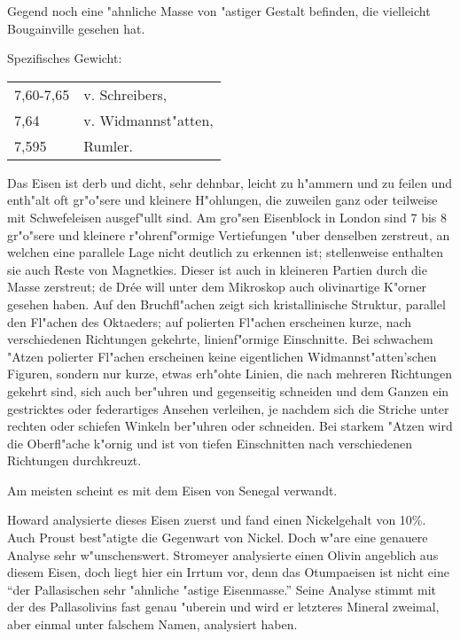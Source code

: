 \documentclass[a4paper, 11pt, oneside]{article}
\begin{document}
Gegend noch eine "ahnliche Masse von "astiger Gestalt befinden, die vielleicht Bougainville gesehen hat.

Spezifisches Gewicht:  
\begin{table}[!ht]
    \centering\swabfamily\Large
    \begin{tabular}{l l}
        7,60-7,65 & v. Schreibers,\\
        7,64 & v. Widmannst"atten,\\
        7,595 & Rumler.
    \end{tabular}
\end{table}

Das Eisen ist derb und dicht, sehr dehnbar, leicht zu h"ammern und zu feilen und enth"alt oft gr"o"sere und kleinere H"ohlungen, die zuweilen ganz oder teilweise mit Schwefeleisen ausgef"ullt sind. Am gro"sen Eisenblock in London sind 7 bis 8 gr"o"sere und kleinere r"ohrenf"ormige Vertiefungen "uber denselben zerstreut, an welchen eine parallele Lage nicht deutlich zu erkennen ist; stellenweise enthalten sie auch Reste von Magnetkies. Dieser ist auch in kleineren Partien durch die Masse zerstreut; de Drée will unter dem Mikroskop auch olivinartige K"orner gesehen haben. Auf den Bruchfl"achen zeigt sich kristallinische Struktur, parallel den Fl"achen des Oktaeders; auf polierten Fl"achen erscheinen kurze, nach verschiedenen Richtungen gekehrte, linienf"ormige Einschnitte. Bei schwachem "Atzen polierter Fl"achen erscheinen keine eigentlichen Widmannst"atten'schen Figuren, sondern nur kurze, etwas erh"ohte Linien, die nach mehreren Richtungen gekehrt sind, sich auch ber"uhren und gegenseitig schneiden und dem Ganzen ein gestricktes oder federartiges Ansehen verleihen, je nachdem sich die Striche unter rechten oder schiefen Winkeln ber"uhren oder schneiden. Bei starkem "Atzen wird die Oberfl"ache k"ornig und ist von tiefen Einschnitten nach verschiedenen Richtungen durchkreuzt.

Am meisten scheint es mit dem Eisen von Senegal verwandt.

Howard analysierte dieses Eisen zuerst und fand einen Nickelgehalt von 10\%. Auch Proust best"atigte die Gegenwart von Nickel. Doch w"are eine genauere Analyse sehr w"unschenswert. Stromeyer analysierte einen Olivin angeblich aus diesem Eisen, doch liegt hier ein Irrtum vor, denn das Otumpaeisen ist nicht eine "`der Pallasischen sehr "ahnliche "astige Eisenmasse."' Seine Analyse stimmt mit der des Pallasolivins fast genau "uberein und wird er letzteres Mineral zweimal, aber einmal unter falschem Namen, analysiert haben.
\end{document}
